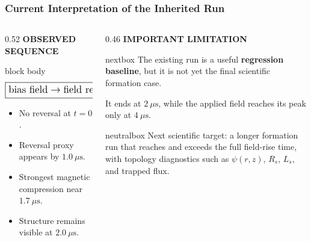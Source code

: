 \documentclass[aspectratio=169,11pt]{beamer}
\newcommand{\smallcapslabel}[1]{%
    {\scriptsize\bfseries\color{myblue}\MakeUppercase{#1}}%
}
\begin{document}
\begin{frame}
\frametitle{Current Interpretation of the Inherited Run}

\begin{columns}[T,totalwidth=\textwidth]
    \begin{column}{0.52\textwidth}
        \smallcapslabel{Observed sequence}
        \vspace{0.08cm}
        \begin{beamercolorbox}[wd=\linewidth,rounded=true,sep=0.65em]{block body}
        \small
	\[
	\resizebox{0.96\linewidth}{!}{$
	\boxed{
	\text{bias field}
	\rightarrow
	\text{field reversal}
	\rightarrow
	\text{compression}
	\rightarrow
	\text{partial relaxation}
	}
	$}
	\]
        \vspace{-0.10cm}
        \begin{itemize}\setlength\itemsep{0.10cm}
            \item No reversal at \(t=0\).
            \item Reversal proxy appears by \(1.0~\mu\mathrm{s}\).
            \item Strongest magnetic compression near \(1.7~\mu\mathrm{s}\).
            \item Structure remains visible at \(2.0~\mu\mathrm{s}\).
        \end{itemize}
        \end{beamercolorbox}
    \end{column}

    \begin{column}{0.46\textwidth}
        \smallcapslabel{Important limitation}
        \vspace{0.08cm}
        \begin{beamercolorbox}[wd=\linewidth,rounded=true,sep=0.58em]{nextbox}
        \small
        The existing run is a useful \textbf{regression baseline}, but it is not yet the final scientific formation case.
        \vspace{0.12cm}

        It ends at \(2~\mu\mathrm{s}\), while the applied field reaches its peak only at \(4~\mu\mathrm{s}\).
        \end{beamercolorbox}

        \vspace{0.14cm}
        \begin{beamercolorbox}[wd=\linewidth,rounded=true,sep=0.58em]{neutralbox}
        \scriptsize
        Next scientific target: a longer formation run that reaches and exceeds the full field-rise time, with topology diagnostics such as \(\psi(r,z)\), \(R_s\), \(L_s\), and trapped flux.
        \end{beamercolorbox}
    \end{column}
\end{columns}

\end{frame}
\end{document}
